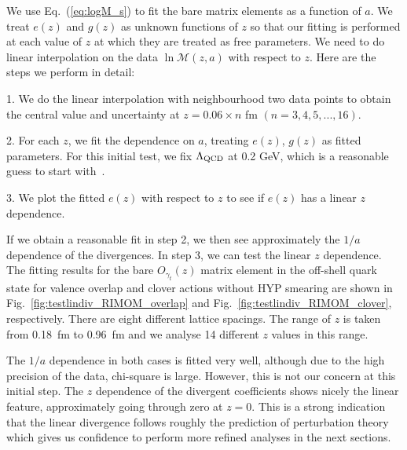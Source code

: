 We use Eq.~(\ref{eq:logM_s}) to fit the bare matrix elements as a function of $a$. We treat $e(z)$ and $g(z)$ as unknown functions of $z$ so that our fitting is performed at each value of $z$ at which they are treated as free parameters. We need to do linear interpolation on the data $\ln \mathcal{M}(z,a)$ with respect to $z$. Here are the steps we perform in detail:

1. We do the linear interpolation with neighbourhood two data points to obtain the central value and uncertainty at $z=0.06\times n$ fm $(n=3,4,5,...,16)$.

2. For each $z$, we fit the dependence on $a$, treating $e(z)$, $g(z)$ as fitted parameters. For this initial test, we fix $\Lambda_{\rm QCD}$ at 0.2 GeV, which is a reasonable guess to start with~\cite{Lepage:1992xa}.

3. We plot the fitted $e(z)$ with respect to $z$ to see if $e(z)$ has a linear $z$ dependence.

If we obtain a reasonable fit in step 2, we then see approximately the $1/a$ dependence of the divergences. In step 3, we can test the linear $z$ dependence. The fitting results for the bare $O_{\gamma_t}(z)$ matrix element in the off-shell quark state for valence overlap and clover actions without HYP smearing are shown in Fig.~\ref{fig:testlindiv_RIMOM_overlap} and Fig.~\ref{fig:testlindiv_RIMOM_clover}, respectively. There
are eight different lattice spacings. The range of $z$
is taken from 0.18~fm to 0.96~fm and we analyse 14 different $z$ values in this range.

The $1/a$ dependence in both cases is fitted very well, although due to the high precision of the data, chi-square
is large. However, this is not our concern at this initial step. 
The $z$ dependence of the divergent coefficients
shows nicely the linear feature, approximately going through
zero at $z=0$. This is a strong indication that
the linear divergence follows roughly
the prediction of perturbation theory which gives
us confidence to perform more refined analyses in the next sections.
